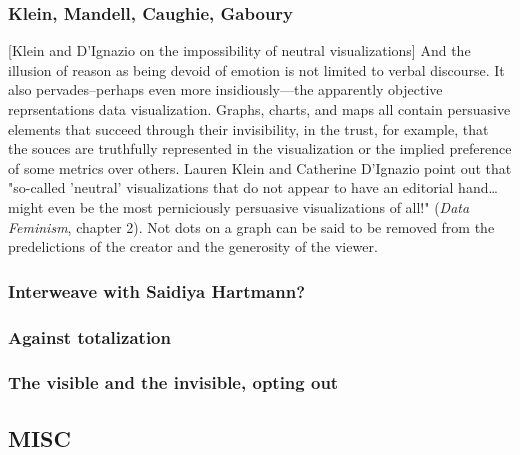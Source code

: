 \documentclass[11pt]{article}
\begin{document}
\subsubsection{Klein, Mandell, Caughie, Gaboury}
\label{sec:org7eb255d}
[Klein and D'Ignazio on the impossibility of neutral visualizations]
And the illusion of reason as being devoid of emotion is not limited
to verbal discourse. It also pervades--perhaps even more
insidiously---the apparently objective reprsentations data
visualization. Graphs, charts, and maps all contain persuasive
elements that succeed through their invisibility, in the trust, for
example, that the souces are truthfully represented in the
visualization or the implied preference of some metrics over
others. Lauren Klein and Catherine D'Ignazio point out that "so-called
'neutral' visualizations that do not appear to have an editorial
hand\ldots{} might even be the most perniciously persuasive visualizations
of all!" (\emph{Data Feminism}, chapter 2). Not dots on a graph can be said
to be removed from the predelictions of the creator and the generosity
of the viewer.

\subsubsection{Interweave with Saidiya Hartmann?}
\label{sec:org5fa005d}
\subsubsection{Against totalization}
\label{sec:orga131cf0}
\subsubsection{The visible and the invisible, opting out}
\label{sec:org6ea0854}





\subsection{MISC}
\label{sec:org967703e}
\end{document}
